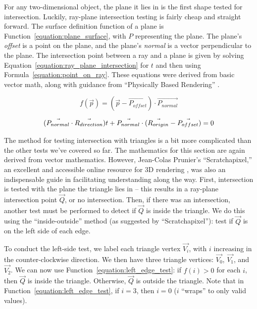 For any two-dimensional object, the plane it lies in is the first shape tested for intersection.
Luckily, ray-plane intersection testing is fairly cheap and straight forward.
The surface definition function of a plane is Function~\ref{equation:plane_surface}, with $P$ representing the plane.
The plane's {\it offset} is a point on the plane, and the plane's {\it normal} is a vector perpendicular to the plane.
The intersection point between a ray and a plane is given by solving Equation~\ref{equation:ray_plane_intersection} for $t$ and then using Formula~\ref{equation:point_on_ray}.
These equations were derived from basic vector math, along with guidance from ``Physically Based Rendering'' \cite{pharr2016physically}.

\begin{equation}
  \label{equation:plane_surface}
  f(\vec{p}) = (\vec{p} - \vec{P_{offset}}) \cdot \vec{P_{normal}}
\end{equation}

\begin{equation}
  \label{equation:ray_plane_intersection}
  (\vec{P_{normal}} \cdot \vec{R_{direction}})t + \vec{P_{normal}} \cdot (\vec{R_{origin}} - \vec{P_{offset}}) = 0
\end{equation}


The method for testing intersection with triangles is a bit more complicated than the other tests we've covered so far.
The mathematics for this section are again derived from vector mathematics.
However, Jean-Colas Prunier's ``Scratchapixel,'' an excellent and accessible online resource for 3D rendering \cite{prunier2017triangle}, was also an indispensable guide in facilitating understanding along the way.
First, intersection is tested with the plane the triangle lies in -- this results in a ray-plane intersection point $\vec{Q}$, or no intersection.
Then, if there was an intersection, another test must be performed to detect if $\vec{Q}$ is inside the triangle.
We do this using the ``inside-outside'' method (as suggested by ``Scratchapixel''): test if $\vec{Q}$ is on the left side of each edge.

To conduct the left-side test, we label each triangle vertex $\vec{V_i}$, with $i$ increasing in the counter-clockwise direction.
We then have three triangle vertices: $\vec{V_0}$, $\vec{V_1}$, and $\vec{V_2}$.
We can now use Function~\ref{equation:left_edge_test}: if $f(i) > 0$ for each $i$, then $\vec{Q}$ is inside the triangle.
Otherwise, $\vec{Q}$ is outside the triangle.
Note that in Function~\ref{equation:left_edge_test}, if $i = 3$, then $i = 0$ ($i$ ``wraps'' to only valid values).

